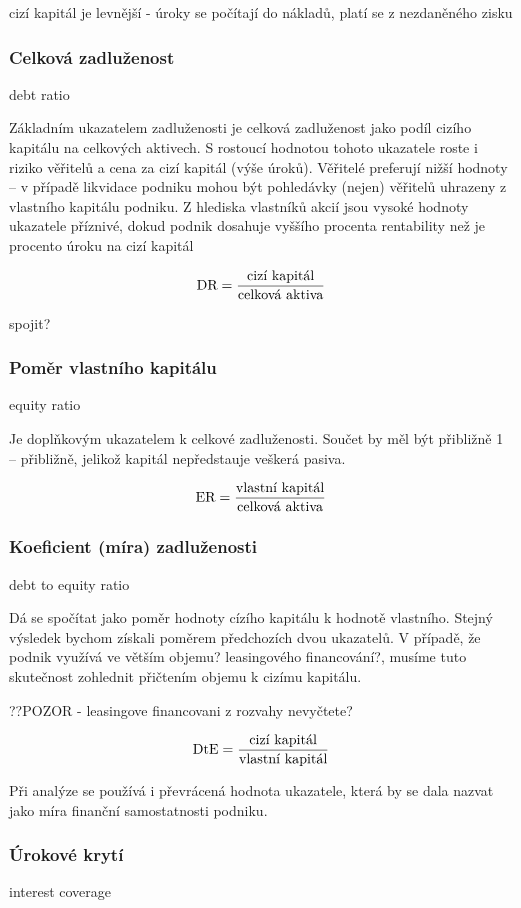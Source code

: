 cizí kapitál je levnější - úroky se počítají do nákladů, platí se z nezdaněného zisku

\subsubsection{Celková zadluženost}
debt ratio

Základním ukazatelem zadluženosti je celková zadluženost jako podíl cizího kapitálu na celkových aktivech. S rostoucí hodnotou tohoto ukazatele roste i riziko věřitelů a cena za cizí kapitál (výše úroků). Věřitelé preferují nižší hodnoty -- v případě likvidace podniku mohou být pohledávky (nejen) věřitelů uhrazeny z vlastního kapitálu podniku.
Z hlediska vlastníků akcií jsou vysoké hodnoty ukazatele příznivé, dokud podnik dosahuje vyššího procenta rentability než je procento úroku na cizí kapitál

$$\text{DR} = \dfrac{\text{cizí kapitál}}{\text{celková aktiva}}$$

spojit?
\subsubsection{Poměr vlastního kapitálu}
equity ratio

Je doplňkovým ukazatelem k celkové zadluženosti. Součet by měl být přibližně 1 -- přibližně, jelikož kapitál nepředstauje veškerá pasiva.

$$\text{ER} = \dfrac{\text{vlastní kapitál}}{\text{celková aktiva}}$$

\subsubsection{Koeficient (míra) zadluženosti}
debt to equity ratio

Dá se spočítat jako poměr hodnoty cízího kapitálu k hodnotě vlastního. Stejný výsledek bychom získali poměrem předchozích dvou ukazatelů. V případě, že podnik využívá ve větším objemu? leasingového financování?, musíme tuto skutečnost zohlednit přičtením objemu k cizímu kapitálu. 

??POZOR - leasingove financovani z rozvahy nevyčtete?

$$\text{DtE} = \dfrac{\text{cizí kapitál}}{\text{vlastní kapitál}}$$

Při analýze se používá i převrácená hodnota ukazatele, která by se dala nazvat jako míra finanční samostatnosti podniku.

\subsubsection{Úrokové krytí}
interest coverage

